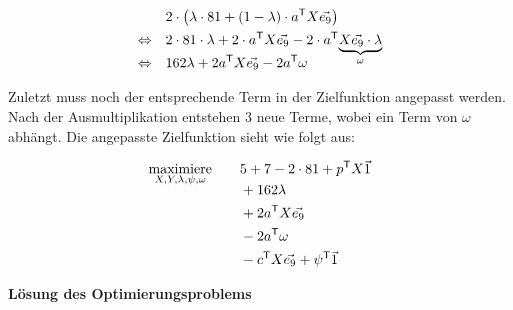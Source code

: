 \begin{align*}
                           & 2 \cdot \left(\lambda\cdot 81 + (1 - \lambda) \cdot a^\mathsf{T}X\vec{e_9}\right)                                                   \\
    \Leftrightarrow  \quad & 2 \cdot 81 \cdot \lambda + 2 \cdot a^\mathsf{T}X\vec{e_9} - 2 \cdot a^\mathsf{T}\smash{\underbrace{X\vec{e_9}\cdot \lambda}_\omega} \\
    \Leftrightarrow  \quad & 162\lambda + 2a^\mathsf{T}X\vec{e_9} - 2a^\mathsf{T}\omega                                                                          \\
\end{align*}
\vspace*{-1.65cm}
\begin{addmargin}[1em]{0em}
    Zuletzt muss noch der entsprechende Term in der Zielfunktion angepasst werden. Nach der Ausmultiplikation entstehen 3 neue Terme, wobei ein Term von $\omega$ abhängt. Die angepasste Zielfunktion sieht wie folgt aus:
\end{addmargin}
\vspace*{-0.4cm}
\begin{align*}
    \smash{\displaystyle{\operatorname*{maximiere}_{X,Y,\lambda,\psi,\omega}}}\qquad & 5 +7 - 2 \cdot 81 + p^\mathsf{T}X\vec{1}          \\
                                                                     & + 162\lambda                                      \\
                                                                     & + 2a^\mathsf{T}X\vec{e_9}                         \\
                                                                     & - 2a^\mathsf{T}\omega                             \\
                                                                     & - c^\mathsf{T}X\vec{e_9} + \psi^\mathsf{T}\vec{1}
\end{align*}
\endgroup


\textbf{Lösung des Optimierungsproblems}
\label{section-loesung-des-optimierungsproblems}

